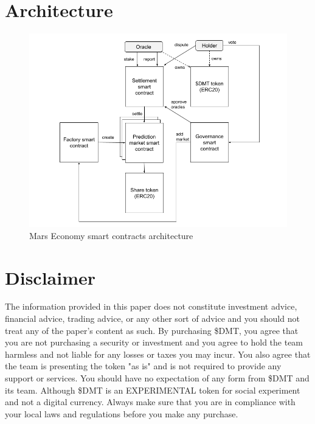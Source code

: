 \documentclass[12pt]{article}
\begin{document}
\section{Architecture}

\begin{figure}[h!]
\includegraphics[scale=0.5]{Architecture}
\centering
\caption{Mars Economy smart contracts architecture}
\label{fig:architecture}
\end{figure}

\pagebreak
\section*{Disclaimer}

The information provided in this paper does not constitute investment advice, financial advice, trading advice, or any other sort of advice and you should not treat any of the paper's content as such. By purchasing \$DMT, you agree that you are not purchasing a security or investment and you agree to hold the team harmless and not liable for any losses or taxes you may incur. You also agree that the team is presenting the token "as is" and is not required to provide any support or services. You should have no expectation of any form from \$DMT and its team. Although \$DMT is an EXPERIMENTAL token for social experiment and not a digital currency. Always make sure that you are in compliance with your local laws and regulations before you make any purchase.
\end{document}
